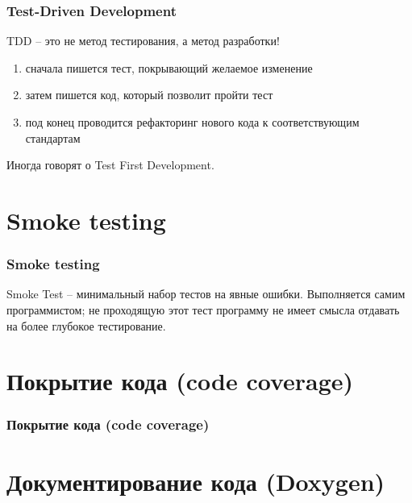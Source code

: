 \documentclass{beamer}
\newlength{\wideitemsep}
\let\olditem\item
\renewcommand{\item}{\setlength{\itemsep}{\wideitemsep}\olditem}
\begin{document}

\begin{frame}
\frametitle{Test-Driven Development}

TDD -- это не метод тестирования, а метод разработки!
\bigskip

\begin{enumerate}
\item сначала пишется тест, покрывающий желаемое изменение
\item затем пишется код, который позволит пройти тест
\item под конец проводится рефакторинг нового кода к соответствующим стандартам
\end{enumerate}
\bigskip

Иногда говорят о Test First Development.

\end{frame}

\section{Smoke testing}

\begin{frame}
\frametitle{Smoke testing}

Smoke Test -- минимальный набор тестов на явные ошибки. Выполняется самим программистом; не проходящую этот тест программу не имеет смысла отдавать на более глубокое тестирование.
\medskip



\end{frame}

\section{Покрытие кода (code coverage)}

\begin{frame}
\frametitle{Покрытие кода (code coverage)}



\end{frame}

\section{Документирование кода (Doxygen)}
\end{document}
